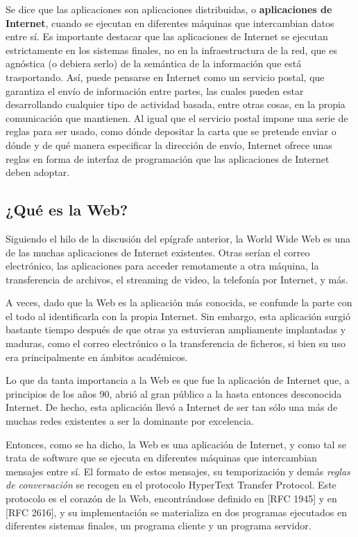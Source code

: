 \documentclass[a4paper,12pt,twoside,openright]{report}
\begin{document}
    Se dice que las aplicaciones son aplicaciones distribuidas, o \textbf{aplicaciones de Internet}, cuando se ejecutan en diferentes máquinas que intercambian datos entre sí. Es importante destacar que las aplicaciones de Internet se ejecutan estrictamente en los sistemas finales, no en la infraestructura de la red, que es agnóstica (o debiera serlo) de la semántica de la información que está trasportando. Así, puede pensarse en Internet como un servicio postal, que garantiza el envío de información entre partes, las cuales pueden estar desarrollando cualquier tipo de actividad basada, entre otras cosas, en la propia comunicación que mantienen. Al igual que el servicio postal impone una serie de reglas para ser usado, como dónde depositar la carta que se pretende enviar o dónde y de qué manera especificar la dirección de envío, Internet ofrece unas reglas en forma de interfaz de programación que las aplicaciones de Internet deben adoptar.
    
    \subsection{¿Qué es la Web?}
    Siguiendo el hilo de la discusión del epígrafe anterior, la World Wide Web es una de las muchas aplicaciones de Internet existentes. Otras serían el correo electrónico, las aplicaciones para acceder remotamente a otra máquina, la transferencia de archivos, el streaming de video, la telefonía por Internet, y más.
    
    A veces, dado que la Web es la aplicación más conocida, se confunde la parte con el todo al identificarla con la propia Internet. Sin embargo, esta aplicación surgió bastante tiempo después de que otras ya estuvieran ampliamente implantadas y maduras, como el correo electrónico o la transferencia de ficheros, si bien su uso era principalmente en ámbitos académicos.
    
    Lo que da tanta importancia a la Web es que fue la aplicación de Internet que, a principios de los años 90, abrió al gran público a la hasta entonces desconocida Internet. De hecho, esta aplicación llevó a Internet de ser tan sólo una más de muchas redes existentes a ser la dominante por excelencia.
   
   	Entonces, como se ha dicho, la Web es una aplicación de Internet, y como tal se trata de software que se ejecuta en diferentes máquinas que intercambian mensajes entre sí. El formato de estos mensajes, su temporización y demás \emph{reglas de conversación} se recogen en el protocolo HyperText Transfer Protocol. Este protocolo es el corazón de la Web, encontrándose definido en [RFC 1945] y en [RFC 2616], y su implementación se materializa en dos programas ejecutados en diferentes sistemas finales, un programa cliente y un programa servidor.
    
\end{document}
